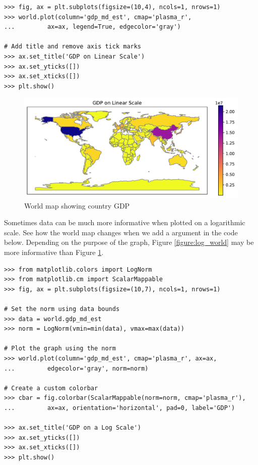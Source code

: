 \begin{lstlisting}
>>> fig, ax = plt.subplots(figsize=(10,4), ncols=1, nrows=1)
>>> world.plot(column='gdp_md_est', cmap='plasma_r',
...			ax=ax, legend=True, edgecolor='gray')

# Add title and remove axis tick marks
>>> ax.set_title('GDP on Linear Scale')
>>> ax.set_yticks([])
>>> ax.set_xticks([])
>>> plt.show()
\end{lstlisting}

\begin{figure}[H]
\begin{center}
\includegraphics[scale=.7]{figures/world_linear.pdf}
\end{center}
\caption{World map showing country GDP}
\label{figure:linear_world}
\end{figure}

Sometimes data can be much more informative when plotted on a logarithmic scale.
See how the world map changes when we add a  argument in the code below.
Depending on the purpose of the graph, Figure \ref{figure:log_world} may be more informative than Figure \ref{figure:linear_world}.

\begin{lstlisting}
>>> from matplotlib.colors import LogNorm
>>> from matplotlib.cm import ScalarMappable
>>> fig, ax = plt.subplots(figsize=(10,7), ncols=1, nrows=1)

# Set the norm using data bounds
>>> data = world.gdp_md_est
>>> norm = LogNorm(vmin=min(data), vmax=max(data))

# Plot the graph using the norm
>>> world.plot(column='gdp_md_est', cmap='plasma_r', ax=ax,
...			edgecolor='gray', norm=norm)

# Create a custom colorbar
>>> cbar = fig.colorbar(ScalarMappable(norm=norm, cmap='plasma_r'),
...			ax=ax, orientation='horizontal', pad=0, label='GDP')

>>> ax.set_title('GDP on a Log Scale')
>>> ax.set_yticks([])
>>> ax.set_xticks([])
>>> plt.show()
\end{lstlisting}

